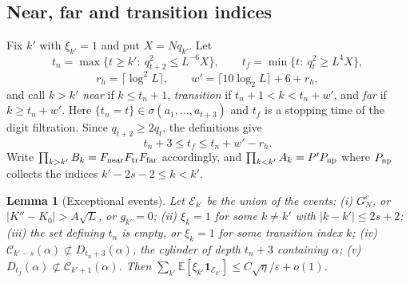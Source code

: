 \documentclass[11pt]{amsart}
\newtheorem{lemma}[theorem]{Lemma}
\theoremstyle{definition}
\numberwithin{equation}{section}
\newcommand{\E}{\mathbb{E}}
\newcommand{\cC}{\mathcal{C}}
\newcommand{\eps}{\varepsilon}
\newcommand{\ind}{\mathbf{1}}
\begin{document}
\subsection*{Near, far and transition indices}
Fix $k'$ with $\xi_{k'}=1$ and put $X=Nq_{k'}$. Let
\[
t_n=\max\{t\ge k':\ q_{t+2}^2\le L^{-6}X\},\qquad t_f=\min\{t:\ q_t^2\ge L^4X\},
\]
\[
r_h=\lceil\log^2L\rceil,\qquad w'=\lceil10\log_2L\rceil+6+r_h,
\]
and call $k>k'$ \emph{near} if $k\le t_n+1$, \emph{transition} if $t_n+1<k<t_n+w'$, and \emph{far} if $k\ge t_n+w'$. Here
$\{t_n=t\}\in\sigma(a_1,\dots,a_{t+3})$ and $t_f$ is a stopping time of the digit filtration. Since $q_{t+2}\ge2q_t$, the definitions give
\begin{equation}\label{eq:zone}
t_n+3\le t_f\le t_n+w'-r_h .
\end{equation}
Write $\prod_{k>k'}B_k=F_{\rm near}F_{\rm tr}F_{\rm far}$ accordingly, and $\prod_{k<k'}A_k=P'P_{\rm np}$ where $P_{\rm np}$ collects the
indices $k'-2s-2\le k<k'$.

\begin{lemma}[Exceptional events]\label{lem:exc}
Let $\mathcal E_{k'}$ be the union of the events: (i) $G_N^c$, or $|K''-K_0|>A\sqrt L$, or $g_{k'}=0$; (ii) $\xi_k=1$ for some $k\ne k'$ with
$|k-k'|\le2s+2$; (iii) the set defining $t_n$ is empty, or $\xi_k=1$ for some transition index $k$; (iv) $\cC_{k'-s}(\alpha)\not\subset D_{t_n+3}(\alpha)$,
the cylinder of depth $t_n+3$ containing $\alpha$; (v) $D_{t_f}(\alpha)\not\subset\cC_{k'+1}(\alpha)$. Then
$\sum_{k'}\E[\xi_{k'}\ind_{\mathcal E_{k'}}]\le C\sqrt\eta/\eps+o(1)$.
\end{lemma}
\end{document}
